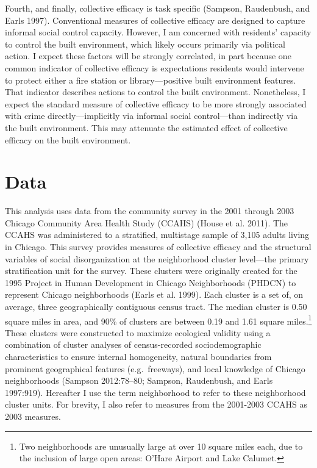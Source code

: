 \documentclass [11pt, proquest] {uwthesis}[2015/03/03]
\begin{document}
Fourth, and finally, collective efficacy is task specific (Sampson, Raudenbush, and Earls 1997). Conventional measures of collective efficacy are designed to capture informal social control capacity. However, I am concerned with residents' capacity to control the built environment, which likely occurs primarily via political action. I expect these factors will be strongly correlated, in part because one common indicator of collective efficacy is expectations residents would intervene to protect either a fire station or library---positive built environment features. That indicator describes actions to control the built environment. Nonetheless, I expect the standard measure of collective efficacy to be more strongly associated with crime directly---implicitly via informal social control---than indirectly via the built environment. This may attenuate the estimated effect of collective efficacy on the built environment.

\hypertarget{data}{%
\section{Data}\label{data}}

This analysis uses data from the community survey in the 2001 through 2003 Chicago Community Area Health Study (CCAHS) (House et al. 2011). The CCAHS was administered to a stratified, multistage sample of 3,105 adults living in Chicago. This survey provides measures of collective efficacy and the structural variables of social disorganization at the neighborhood cluster level---the primary stratification unit for the survey. These clusters were originally created for the 1995 Project in Human Development in Chicago Neighborhoods (PHDCN) to represent Chicago neighborhoods (Earls et al. 1999). Each cluster is a set of, on average, three geographically contiguous census tract. The median cluster is 0.50 square miles in area, and 90\% of clusters are between 0.19 and 1.61 square miles.\footnote{Two neighborhoods are unusually large at over 10 square miles each, due to the inclusion of large open areas: O'Hare Airport and Lake Calumet.} These clusters were constructed to maximize ecological validity using a combination of cluster analyses of census-recorded sociodemographic characteristics to ensure internal homogeneity, natural boundaries from prominent geographical features (e.g.~freeways), and local knowledge of Chicago neighborhoods (Sampson 2012:78--80; Sampson, Raudenbush, and Earls 1997:919). Hereafter I use the term neighborhood to refer to these neighborhood cluster units. For brevity, I also refer to measures from the 2001-2003 CCAHS as 2003 measures.
\end{document}
